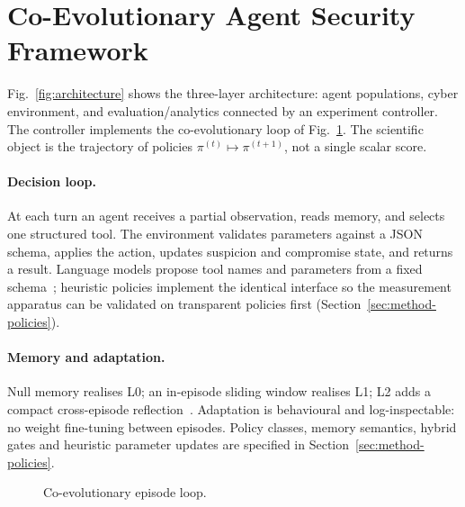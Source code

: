 \section{Co-Evolutionary Agent Security Framework}
\label{sec:framework}

Fig.~\ref{fig:architecture} shows the three-layer architecture: agent
populations, cyber environment, and evaluation/analytics connected by an
experiment controller. The controller implements the co-evolutionary loop
of Fig.~\ref{fig:loop}. The scientific object is the trajectory of policies
$\pi^{(t)}\mapsto\pi^{(t+1)}$, not a single scalar score.



\paragraph{Decision loop.}
At each turn an agent receives a partial observation, reads memory, and
selects one structured tool. The environment validates parameters against
a JSON schema, applies the action, updates suspicion and compromise state,
and returns a result. Language models propose tool names and parameters from
a fixed schema~\cite{schick2023toolformer,yao2023react}; heuristic policies
implement the identical interface so the measurement apparatus can be
validated on transparent policies first (Section~\ref{sec:method-policies}).

\paragraph{Memory and adaptation.}
Null memory realises L0; an in-episode sliding window realises L1; L2 adds
a compact cross-episode reflection~\cite{shinn2023reflexion}. Adaptation is
behavioural and log-inspectable: no weight fine-tuning between episodes.
Policy classes, memory semantics, hybrid gates and heuristic parameter updates
are specified in Section~\ref{sec:method-policies}.

\begin{figure}[!t]
\centering
{}
\caption{Co-evolutionary episode loop.}
\label{fig:loop}
\end{figure}

